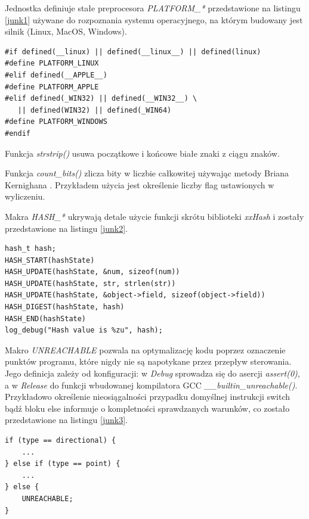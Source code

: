 Jednostka definiuje stałe preprocesora \textit{PLATFORM\_*} przedstawione na listingu \ref{junk1} używane do rozpoznania systemu operacyjnego, na którym budowany jest silnik (Linux, MacOS, Windows).
\lstset{language=C}
\begin{lstlisting}[caption={Stałe preprocesora używane do rozpoznania systemu operacyjnego},captionpos=b,label={junk1}]
#if defined(__linux) || defined(__linux__) || defined(linux)
#define PLATFORM_LINUX
#elif defined(__APPLE__)
#define PLATFORM_APPLE
#elif defined(_WIN32) || defined(__WIN32__) \
   || defined(WIN32) || defined(_WIN64)
#define PLATFORM_WINDOWS
#endif
\end{lstlisting}

Funkcja \textit{strstrip()} usuwa początkowe i końcowe białe znaki z ciągu znaków.

Funkcja \textit{count\_bits()} zlicza bity w liczbie całkowitej używając metody Briana Kernighana \cite{BITTWIDDLINGHACKS}. Przykładem użycia jest określenie liczby flag ustawionych w wyliczeniu.

Makra \textit{HASH\_*} ukrywają detale użycie funkcji skrótu biblioteki \textit{xxHash} i zostały przedstawione na listingu \ref{junk2}.
\lstset{language=C}
\begin{lstlisting}[caption={Przykład użycia funkcji skrótu},captionpos=b,label={junk2}]
hash_t hash;
HASH_START(hashState)
HASH_UPDATE(hashState, &num, sizeof(num))
HASH_UPDATE(hashState, str, strlen(str))
HASH_UPDATE(hashState, &object->field, sizeof(object->field))
HASH_DIGEST(hashState, hash)
HASH_END(hashState)
log_debug("Hash value is %zu", hash);
\end{lstlisting}

Makro \textit{UNREACHABLE} pozwala na optymalizację kodu poprzez oznaczenie punktów programu, które nigdy nie są napotykane przez przepływ sterowania.
Jego definicja zależy od konfiguracji: w \textit{Debug} sprowadza się do asercji \textit{assert(0)}, a w \textit{Release} do funkcji wbudowanej kompilatora GCC \textit{\_\_builtin\_unreachable()}.
Przykładowo określenie nieosiągalności przypadku domyślnej instrukcji switch bądź bloku else informuje o
kompletności sprawdzanych warunków, co zostało przedstawione na listingu \ref{junk3}.
\lstset{language=C}
\begin{lstlisting}[caption={Przykład użycia makra UNREACHABLE},captionpos=b,label={junk3}]
if (type == directional) {
	...
} else if (type == point) {
	...
} else {
	UNREACHABLE;
}
\end{lstlisting}

